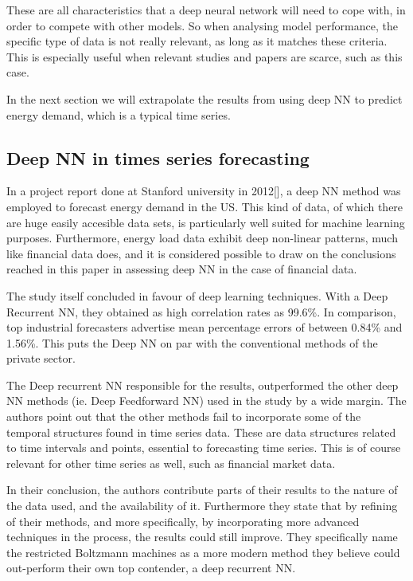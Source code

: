 These are all characteristics that a deep neural network will need to cope with, in order to compete with other models. So when analysing model performance, the  specific type of data is not really relevant, as long as it matches these criteria. This is especially useful when relevant studies and papers are scarce, such as this case.

In the next section we will extrapolate the results from using deep NN to predict energy demand, which is a typical time series.

\subsection{Deep NN in times series forecasting}

In a project report done at Stanford university in 2012[], a deep NN method was employed to forecast energy demand in the US. This kind of data, of which there are huge easily accesible data sets, is particularly well suited for machine learning purposes. Furthermore, energy load data exhibit deep non-linear patterns, much like financial data does, and it is considered possible to draw on the conclusions reached in this paper in assessing deep NN in the case of financial data.

The study itself concluded in favour of deep learning techniques. With a Deep Recurrent NN, they obtained as high correlation rates as 99.6\%. In comparison, top industrial forecasters advertise mean percentage errors of between 0.84\% and 1.56\%. This puts the Deep NN on par with the conventional methods of the private sector.

The Deep recurrent NN responsible for the results, outperformed the other deep NN methods (ie. Deep Feedforward NN) used in the study by a wide margin. The authors point out that the other methods fail to incorporate some of the temporal structures found in time series data. These are data structures related to time intervals and points, essential to forecasting time series. This is of course relevant for other time series as well, such as financial market data.

In their conclusion, the authors contribute parts of their results to the nature of the data used, and the availability of it. Furthermore they state that by refining of their methods, and more specifically, by incorporating more advanced techniques in the process, the results could still improve. They specifically name the restricted Boltzmann machines as a more modern method they believe could out-perform their own top contender, a deep recurrent NN.


